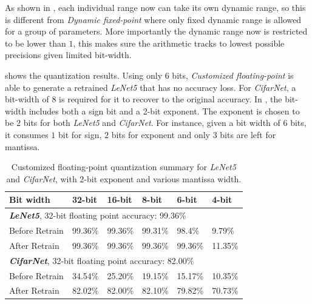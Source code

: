 \documentclass[a4paper,12pt]{report}
\begin{document}
As shown in , each individual range now can take its own
dynamic range, so this is different from \textit{Dynamic fixed-point} where
only fixed dynamic range is allowed for a group of parameters.
More importantly the dynamic range now is restricted to be lower than $1$,
this makes sure the arithmetic tracks to lowest possible precisions given
limited bit-width.

 shows the quantization results.
Using only 6 bits, \textit{Customized floating-point} is able to generate a retrained
\textit{LeNet5} that has no accuracy loss.
For \textit{CifarNet}, a bit-width of $8$ is required for it to recover
to the original accuracy.
In , the bit-width includes both a sign bit and a 2-bit exponent.
The exponent is chosen to be $2$ bits for both \textit{LeNet5} and \textit{CifarNet}.
For instance, given a bit width of $6$ bits, it consumes $1$ bit for sign, $2$
bits for exponent and only $3$ bits are left for mantissa.

\begin{table}[!h]
  \centering
  \begin{tabular}{llllll}
    \hline
    \hline
    Bit width               &32-bit     &16-bit     &8-bit     &6-bit      &4-bit    \\
    \hline
    \multicolumn{5}{l}{\textbf{\textit{LeNet5}}, 32-bit floating point accuracy: 99.36\%}\\
    \hline
    \hline
    Before Retrain          &99.36\%    &99.36\%    &99.31\%  &98.4\%      &9.79\%\\
    After Retrain           &99.36\%    &99.36\%    &99.36\%  &99.36\%     &11.35\%\\
    \hline
    \hline
    \multicolumn{5}{l}{\textbf{\textit{CifarNet}}, 32-bit floating point accuracy: 82.00\%}\\
    \hline
    Before Retrain          &34.54\%    &25.20\%  &19.15\%  &15.17\%       &10.35\%\\
    After Retrain           &82.02\%    &82.00\%  &82.10\%  &79.82\%       &70.73\%\\
    \hline
    \hline
  \end{tabular}
  \caption{Customized floating-point quantization summary for \textit{LeNet5} and \textit{CifarNet}, with 2-bit exponent and various mantissa width.}
  \label{tab:cfp_sum}
\end{table}
\end{document}
